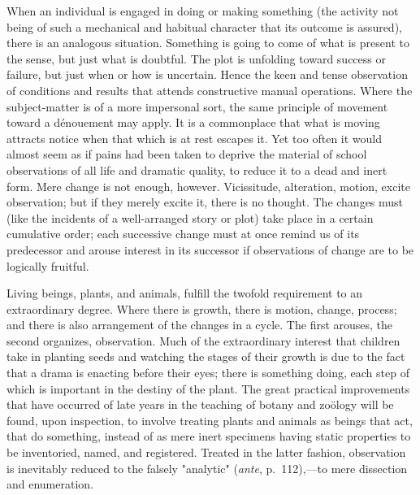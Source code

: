 \documentclass[letterpaper]{book}
\begin{document}
When an individual is engaged in doing or making something (the activity
not being of such a mechanical and habitual character that its outcome
is assured), there is an analogous situation. Something is going to come
of what is present to the sense, but just what is doubtful. The plot is
unfolding toward success or failure, but just when or how is uncertain.
Hence the keen and tense observation of conditions and results that
attends constructive manual operations. Where the subject-matter is of a
more impersonal sort, the same principle of movement toward a dénouement
may apply. It is a commonplace that what is moving attracts notice when
that which is at rest escapes it. Yet too often it would almost seem as
if pains had been taken to deprive the material of school observations
of all life and dramatic quality, to reduce it to a dead and inert form.
Mere change is not enough, however. Vicissitude, alteration, motion,
excite observation; but if they merely excite it, there is no thought.
The changes must (like the incidents of a well-arranged story or plot)
take place in a certain cumulative order; each successive change must at
once remind us of its predecessor and arouse interest in its successor
if observations of change are to be logically fruitful.


Living beings, plants, and animals, fulfill the twofold requirement to
an extraordinary degree. Where
there
is growth, there is motion, change, process; and there is also
arrangement of the changes in a cycle. The first arouses, the second
organizes, observation. Much of the extraordinary interest that children
take in planting seeds and watching the stages of their growth is due to
the fact that a drama is enacting before their eyes; there is something
doing, each step of which is important in the destiny of the plant. The
great practical improvements that have occurred of late years in the
teaching of botany and zoölogy will be found, upon inspection, to
involve treating plants and animals as beings that act, that do
something, instead of as mere inert specimens having static properties
to be inventoried, named, and registered. Treated in the latter fashion,
observation is inevitably reduced to the falsely "analytic"
(\emph{ante}, p.\ 112),---to mere dissection and enumeration.

\end{document}
